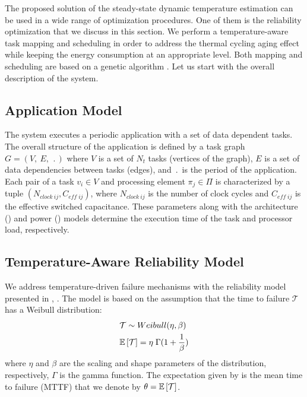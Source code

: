 The proposed solution of the steady-state dynamic temperature estimation can be used in a wide range of optimization procedures. One of them is the reliability optimization that we discuss in this section. We perform a temperature-aware task mapping and scheduling in order to address the thermal cycling aging effect while keeping the energy consumption at an appropriate level. Both mapping and scheduling are based on a genetic algorithm \cite{schmitz2004}. Let us start with the overall description of the system.

\subsection{Application Model} \label{sec:application-model}
The system executes a periodic application with a set of data dependent tasks. The overall structure of the application is defined by a task graph $G = (V, \: E, \: \period)$ where $V$ is a set of $N_t$ tasks (vertices of the graph), $E$ is a set of data dependencies between tasks (edges), and $\period$ is the period of the application. Each pair of a task $v_i \in V$ and processing element $\pi_j \in \Pi$ is characterized by a tuple $(N_{clock \: ij}, C_{eff \; ij})$, where $N_{clock \: ij}$ is the number of clock cycles and $C_{eff \; ij}$ is the effective switched capacitance. These parameters along with the architecture () and power () models determine the execution time of the task and processor load, respectively.

\subsection{Temperature-Aware Reliability Model} \label{sec:reliability-model}
We address temperature-driven failure mechanisms with the reliability model presented in \cite{huang2009}, \cite{xiang2010}. The model is based on the assumption that the time to failure $\mathcal{T}$ has a Weibull distribution:
\begin{align}
  & \mathcal{T} \sim Weibull(\eta, \beta) \nonumber \\
  & \mathbb{E}\left[ \mathcal{T} \right] = \eta \; \Gamma(1 + \frac{1}{\beta}) \label{eq:general-mttf}
\end{align}
where $\eta$ and $\beta$ are the scaling and shape parameters of the distribution, respectively, $\Gamma$ is the gamma function. The expectation given by  is the mean time to failure (MTTF) that we denote by $\theta = \mathbb{E}\left[ \mathcal{T} \right]$.

